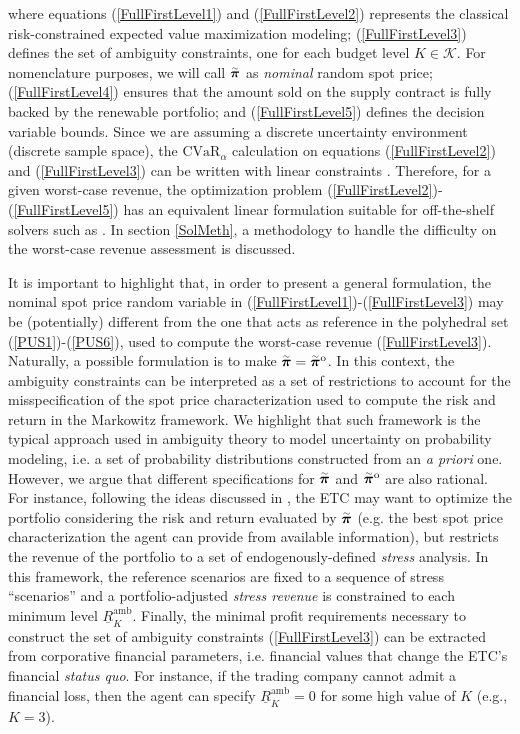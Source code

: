 %
where equations (\ref{FullFirstLevel1}) and (\ref{FullFirstLevel2}) represents the classical risk-constrained expected value maximization modeling; (\ref{FullFirstLevel3}) defines the set of ambiguity constraints, one for each budget level $K \in \mathcal{K}$. For nomenclature purposes, we will call $\accentset{\sim}{\boldsymbol{\pi}}$ as \textit{nominal} random spot price; (\ref{FullFirstLevel4}) ensures that the amount sold on the supply contract is fully backed by the renewable portfolio; and (\ref{FullFirstLevel5}) defines the decision variable bounds. Since we are assuming a discrete uncertainty environment (discrete sample space), the $\text{CVaR}_{\alpha}$ calculation on equations (\ref{FullFirstLevel2}) and (\ref{FullFirstLevel3}) can be written with linear constraints \cite{OptimizCVaR}. Therefore, for a given worst-case revenue, the optimization problem (\ref{FullFirstLevel2})-(\ref{FullFirstLevel5}) has an equivalent linear formulation suitable for off-the-shelf solvers such as \cite{Xpress}. In section \ref{SolMeth}, a methodology to handle the difficulty on the worst-case revenue assessment is discussed.

	It is important to highlight that, in order to present a general formulation, the nominal spot price random variable in (\ref{FullFirstLevel1})-(\ref{FullFirstLevel3}) may be (potentially) different from the one that acts as reference in the polyhedral set (\ref{PUS1})-(\ref{PUS6}), used to compute the worst-case revenue (\ref{FullFirstLevel3}). Naturally, a possible formulation is to make $\accentset{\sim}{\boldsymbol{\pi}} = \accentset{\sim}{\boldsymbol{\pi}}^{\text{o}}$. In this context, the ambiguity constraints can be interpreted as a set of restrictions to account for the misspecification of the spot price characterization used to compute the risk and return in the Markowitz framework. We highlight that such framework is the typical approach used in ambiguity theory to model uncertainty on probability modeling, i.e. a set of probability distributions constructed from an \textit{a priori} one. However, we argue that different specifications for $\accentset{\sim}{\boldsymbol{\pi}}$ and $\accentset{\sim}{\boldsymbol{\pi}}^{\text{o}}$ are also rational. For instance, following the ideas discussed in \cite{RobustSpotPrice}, the ETC may want to optimize the portfolio considering the risk and return evaluated by $\accentset{\sim}{\boldsymbol{\pi}}$ (e.g. the best spot price characterization the agent can provide from available information), but restricts the revenue of the portfolio to a set of endogenously-defined \textit{stress} analysis. In this framework, the reference scenarios are fixed to a sequence of stress ``scenarios'' and a portfolio-adjusted \textit{stress revenue} is constrained to each minimum level $\underline{R}_{K}^{\text{amb}}$. Finally, the minimal profit requirements necessary to construct the set of ambiguity constraints (\ref{FullFirstLevel3}) can be extracted from corporative financial parameters, i.e. financial values that change the ETC's financial \textit{status quo}. For instance, if the trading company cannot admit a financial loss, then the agent can specify $\underline{R}_{K}^{\text{amb}} = 0$ for some high value of $K$ (e.g., $K =3$).